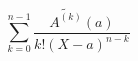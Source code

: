 \begin{displaymath}
 \sum_{k=0}^{n-1}\frac{\widetilde{A^{(k)}}(a)}{k!(X-a)^{n-k}}
\end{displaymath}

